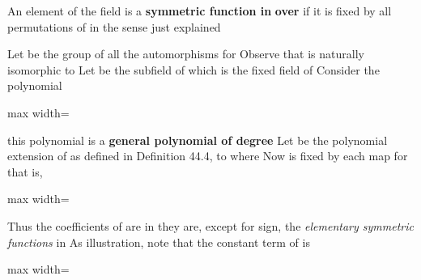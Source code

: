 \documentclass[11pt,oneside]{article}
\begin{document}
\begin{BookBody}
 An element of the field  is a\textbf{ symmetric function in}  \textbf{over}  if it is fixed by all permutations of  in the sense just explained\BookEnd{\blacksquare}

Let  be the group of all the automorphisms \BookInline{\overline{\sigma }} for  Observe that  is naturally isomorphic to  Let  be the subfield of  which is the fixed field of  Consider the polynomial

\begin{center}\begin{adjustbox}{max width=\linewidth}\end{adjustbox}\end{center}

\noindent this polynomial  is a\textbf{ general polynomial of degree}  Let  be the polynomial extension of \BookInline{\overline{\sigma },\allowbreak } as defined in Definition 44.4, to  where  Now  is fixed by each map  for  that is,

\begin{center}\begin{adjustbox}{max width=\linewidth}\end{adjustbox}\end{center}

\noindent Thus the coefficients of  are in  they are, except for sign, the\textit{ elementary symmetric} \textit{functions} in  As illustration, note that the constant term of  is

\begin{center}\begin{adjustbox}{max width=\linewidth}\end{adjustbox}\end{center}


\end{BookBody}
\end{document}
